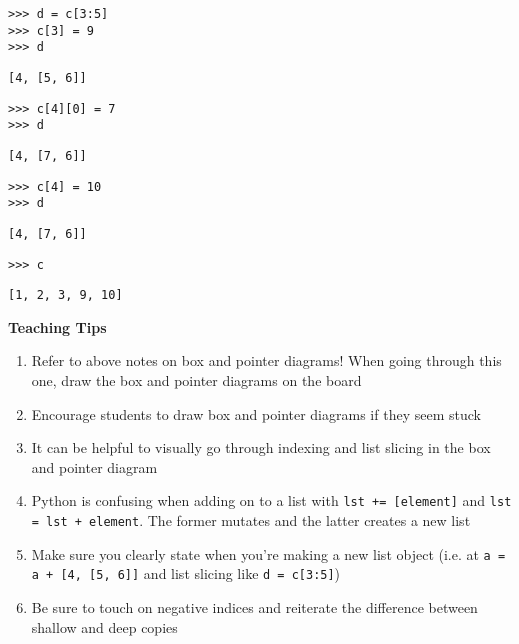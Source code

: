 \begin{blocksection}

\begin{lstlisting}
>>> d = c[3:5]
>>> c[3] = 9
>>> d

\end{lstlisting}
\begin{solution}[.25in]
\begin{lstlisting}
[4, [5, 6]]
\end{lstlisting}
\end{solution}

\begin{lstlisting}
>>> c[4][0] = 7
>>> d
\end{lstlisting}
\begin{solution}[.25in]
\begin{lstlisting}
[4, [7, 6]]
\end{lstlisting}
\end{solution}
\end{blocksection}
\begin{blocksection}
\begin{lstlisting}
>>> c[4] = 10
>>> d
\end{lstlisting}
\begin{solution}[.25in]
\begin{lstlisting}
[4, [7, 6]]
\end{lstlisting}
\end{solution}

\begin{lstlisting}
>>> c
\end{lstlisting}
\begin{solution}[.25in]
\begin{lstlisting}
[1, 2, 3, 9, 10]
\end{lstlisting}
\end{solution}

\end{blocksection}
    
\begin{questionmeta}
    \textbf{Teaching Tips}
    \begin{enumerate}
            \item Refer to above notes on box and pointer diagrams! When going through this one, draw the box and pointer diagrams on the board
            \item Encourage students to draw box and pointer diagrams if they seem stuck
            \item It can be helpful to visually go through indexing and list slicing in the box and pointer diagram
            \item Python is confusing when adding on to a list with \lstinline{lst += [element]} and \lstinline{lst = lst + element}. The former mutates and the latter creates a new list
            \item Make sure you clearly state when you’re making a new list object (i.e. at \lstinline{a = a + [4, [5, 6]]} and list slicing like \lstinline{d = c[3:5]})
            \item Be sure to touch on negative indices and reiterate the difference between shallow and deep copies
    \end{enumerate}
\end{questionmeta}